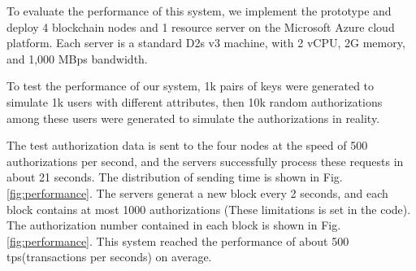 To evaluate the performance of this system, we implement the prototype and deploy 4 blockchain nodes and 1 resource server on the Microsoft Azure cloud platform. Each server is a standard D2s v3 machine, with 2 vCPU, 2G memory, and 1,000 MBps bandwidth.

To test the performance of our system, 1k pairs of keys were generated to simulate 1k users with different attributes, then 10k random authorizations among these users were generated to simulate the authorizations in reality.

The test authorization data is sent to the four nodes at the speed of 500 authorizations per second, and the servers successfully process these requests in about 21 seconds. The distribution of sending time is shown in Fig.\ref{fig:performance}. The servers generat a new block every 2 seconds, and each block contains at most 1000 authorizations (These limitations is set in the code). The authorization number contained in each block is shown in Fig.\ref{fig:performance}. This system reached the performance of about 500 tps(transactions per seconds) on average.